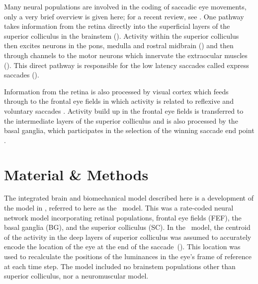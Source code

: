 \documentclass{frontiersSCNS}
\begin{document}


Many neural populations are involved in the coding of saccadic eye
movements, only a very brief overview is given here; for a recent
review, see . One pathway takes
information from the retina directly into the superficial layers of
the superior colliculus in the brainstem (). Activity within
the superior colliculus then excites neurons in the pons, medulla and
rostral midbrain () and then through
channels to the motor neurons which innervate the extraocular muscles
(). This direct pathway
is responsible for the low latency saccades called express saccades
().

Information from the retina is also processed by visual cortex which
feeds through to the frontal eye fields in which activity is related
to reflexive and voluntary
saccades . Activity build up in the frontal
eye fields is transferred to the intermediate layers of the superior
colliculus
 and is also processed by the basal ganglia, which
participates in the selection of the winning saccade end point
.





\section{Material \& Methods}

The integrated brain and biomechanical model described here is a
development of the model in ,
referred to here as the \ccg~model. This was a rate-coded neural
network model incorporating retinal populations, frontal eye fields
(FEF), the basal ganglia (BG), and the superior colliculus (SC). In
the \ccg~model, the centroid of the activity in the deep
layers of superior colliculus was assumed to accurately encode the
location of the eye at the end of the
saccade~(\cite{wurtz_activity_1972,robinson_eye_1972,van_gisbergen_collicular_1987,mcilwain_lateral_1982}).
This location was used to recalculate the positions of the luminances in
the eye's frame of reference at each time step. The model included no
brainstem populations other than superior colliculus, nor a
neuromuscular model.
\end{document}
